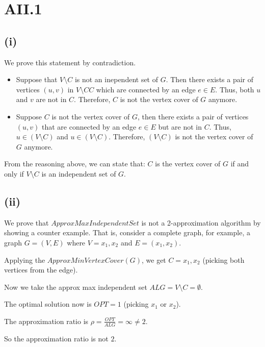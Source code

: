 \section* {AII.1}
\label {a2-1}
\subsection*{(i)}
We prove this statement by contradiction.

\begin{itemize}
	\item Suppose that $V \setminus C$ is not an inependent set of $G$. Then there exists a pair of vertices $(u,v)$ in $V \setminus C C$ which are connected by an edge $e \in E$. Thus, both $u$ and $v$ are not in $C$. Therefore, $C$ is not the vertex cover of $G$ anymore.
	\item Suppose $C$ is not the vertex cover of $G$, then there exists a pair of vertices $(u,v)$ that are connected by an edge $e \in E$ but are not in $C$. Thus, $u \in (V \setminus C)$ and $u \in (V \setminus C)$. Therefore, $(V \setminus C)$ is not the vertex cover of $G$ anymore.

\end{itemize}

From the reasoning above, we can state that: $C$ is the vertex cover of $G$ if and only if $V \setminus C$ is an independent set of $G$.

\subsection*{(ii)}
We prove that $ApproxMaxIndependentSet$ is not a 2-approximation algorithm by showing a counter example. That is, consider a complete graph, for example, a graph $G = (V, E)$ where $V = {x_1, x_2}$ and $E = (x_1, x_2)$. 

Applying the $ApproxMinVertexCover(G)$, we get $C = {x_1, x_2}$ (picking both vertices from the edge).

Now we take the approx max independent set $ALG = V \setminus C = \emptyset$.

The optimal solution now is $OPT = 1$ (picking $x_1$ or $x_2$).

The approximation ratio is $\rho = \frac{OPT}{ALG} = \infty \neq 2$.

So the approximation ratio is not $2$.
